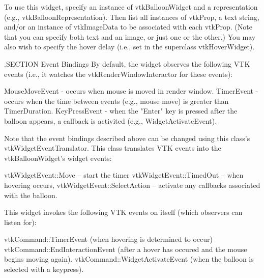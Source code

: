 To use this widget, specify an instance of vtk\-Balloon\-Widget and a representation (e.\-g., vtk\-Balloon\-Representation). Then list all instances of vtk\-Prop, a text string, and/or an instance of vtk\-Image\-Data to be associated with each vtk\-Prop. (Note that you can specify both text and an image, or just one or the other.) You may also wish to specify the hover delay (i.\-e., set in the superclass vtk\-Hover\-Widget).

.S\-E\-C\-T\-I\-O\-N Event Bindings By default, the widget observes the following V\-T\-K events (i.\-e., it watches the vtk\-Render\-Window\-Interactor for these events)\-: 
\begin{DoxyPre}
   MouseMoveEvent - occurs when mouse is moved in render window.
   TimerEvent - occurs when the time between events (e.g., mouse move)
                is greater than TimerDuration.
   KeyPressEvent - when the "Enter" key is pressed after the balloon appears,
                   a callback is activited (e.g., WidgetActivateEvent).
 \end{DoxyPre}


Note that the event bindings described above can be changed using this class's vtk\-Widget\-Event\-Translator. This class translates V\-T\-K events into the vtk\-Balloon\-Widget's widget events\-: 
\begin{DoxyPre}
   vtkWidgetEvent::Move -- start the timer
   vtkWidgetEvent::TimedOut -- when hovering occurs,
   vtkWidgetEvent::SelectAction -- activate any callbacks associated 
                                   with the balloon.
 \end{DoxyPre}


This widget invokes the following V\-T\-K events on itself (which observers can listen for)\-: 
\begin{DoxyPre}
   vtkCommand::TimerEvent (when hovering is determined to occur)
   vtkCommand::EndInteractionEvent (after a hover has occured and the
                                    mouse begins moving again).
   vtkCommand::WidgetActivateEvent (when the balloon is selected with a
                                    keypress).
 \end{DoxyPre}


